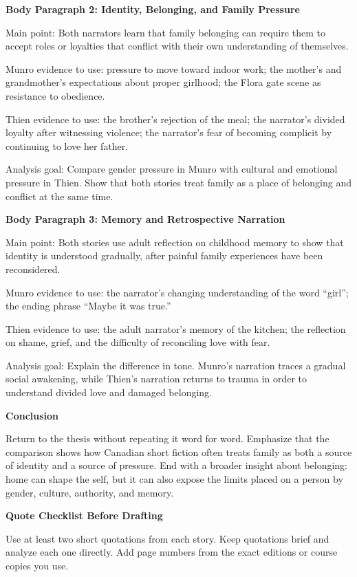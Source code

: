 \documentclass[12pt]{article}
\begin{document}
\textbf{Body Paragraph 2: Identity, Belonging, and Family Pressure}

Main point: Both narrators learn that family belonging can require them to accept roles or loyalties that conflict with their own understanding of themselves.

Munro evidence to use: pressure to move toward indoor work; the mother's and grandmother's expectations about proper girlhood; the Flora gate scene as resistance to obedience.

Thien evidence to use: the brother's rejection of the meal; the narrator's divided loyalty after witnessing violence; the narrator's fear of becoming complicit by continuing to love her father.

Analysis goal: Compare gender pressure in Munro with cultural and emotional pressure in Thien. Show that both stories treat family as a place of belonging and conflict at the same time.

\textbf{Body Paragraph 3: Memory and Retrospective Narration}

Main point: Both stories use adult reflection on childhood memory to show that identity is understood gradually, after painful family experiences have been reconsidered.

Munro evidence to use: the narrator's changing understanding of the word ``girl''; the ending phrase ``Maybe it was true.''

Thien evidence to use: the adult narrator's memory of the kitchen; the reflection on shame, grief, and the difficulty of reconciling love with fear.

Analysis goal: Explain the difference in tone. Munro's narration traces a gradual social awakening, while Thien's narration returns to trauma in order to understand divided love and damaged belonging.

\textbf{Conclusion}

Return to the thesis without repeating it word for word. Emphasize that the comparison shows how Canadian short fiction often treats family as both a source of identity and a source of pressure. End with a broader insight about belonging: home can shape the self, but it can also expose the limits placed on a person by gender, culture, authority, and memory.

\textbf{Quote Checklist Before Drafting}

Use at least two short quotations from each story. Keep quotations brief and analyze each one directly. Add page numbers from the exact editions or course copies you use.
\end{document}
